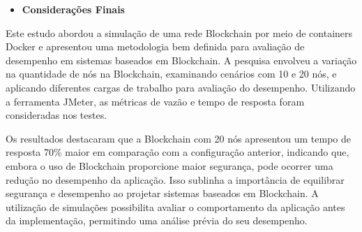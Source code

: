         

       \begin{itemize}[label= $\ast$]
            \item \textbf{Considerações Finais}
        \end{itemize}
        
        Este estudo abordou a simulação de uma rede Blockchain por meio de containers Docker e apresentou uma metodologia bem definida para avaliação de desempenho em sistemas baseados em Blockchain. A pesquisa envolveu a variação na quantidade de nós na Blockchain, examinando cenários com 10 e 20 nós, e aplicando diferentes cargas de trabalho para avaliação do desempenho. Utilizando a ferramenta JMeter, as métricas de vazão e tempo de resposta foram consideradas nos testes.

Os resultados destacaram que a Blockchain com 20 nós apresentou um tempo de resposta 70\% maior em comparação com a configuração anterior, indicando que, embora o uso de Blockchain proporcione maior segurança, pode ocorrer uma redução no desempenho da aplicação. Isso sublinha a importância de equilibrar segurança e desempenho ao projetar sistemas baseados em Blockchain. A utilização de simulações possibilita avaliar o comportamento da aplicação antes da implementação, permitindo uma análise prévia do seu desempenho.

        

